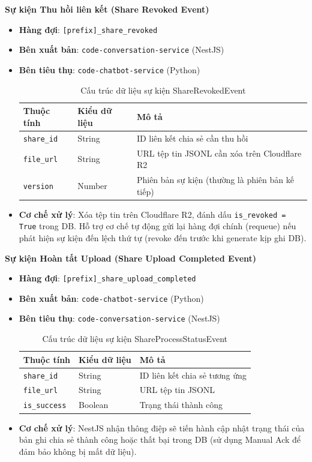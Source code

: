 \textbf{Sự kiện Thu hồi liên kết (Share Revoked Event)}
\begin{itemize}
\item \textbf{Hàng đợi}: \texttt{[prefix]\_share\_revoked}
\item \textbf{Bên xuất bản}: \texttt{code-conversation-service} (NestJS)
\item \textbf{Bên tiêu thụ}: \texttt{code-chatbot-service} (Python)

\begin{table}[H]
\centering
\begin{tabular}{|l|l|l|}
\hline
\textbf{Thuộc tính} & \textbf{Kiểu dữ liệu} & \textbf{Mô tả} \\ \hline
\texttt{share\_id} & String & ID liên kết chia sẻ cần thu hồi \\ \hline
\texttt{file\_url} & String & URL tệp tin JSONL cần xóa trên Cloudflare R2 \\ \hline
\texttt{version} & Number & Phiên bản sự kiện (thường là phiên bản kế tiếp) \\ \hline
\end{tabular}
\caption{Cấu trúc dữ liệu sự kiện ShareRevokedEvent}
\end{table}

\item \textbf{Cơ chế xử lý}: Xóa tệp tin trên Cloudflare R2, đánh dấu \texttt{is\_revoked = True} trong DB. Hỗ trợ cơ chế tự động gửi lại hàng đợi chính (requeue) nếu phát hiện sự kiện đến lệch thứ tự (revoke đến trước khi generate kịp ghi DB).
\end{itemize}

\textbf{Sự kiện Hoàn tất Upload (Share Upload Completed Event)}
\begin{itemize}
\item \textbf{Hàng đợi}: \texttt{[prefix]\_share\_upload\_completed}
\item \textbf{Bên xuất bản}: \texttt{code-chatbot-service} (Python)
\item \textbf{Bên tiêu thụ}: \texttt{code-conversation-service} (NestJS)

\begin{table}[H]
\centering
\begin{tabular}{|l|l|l|}
\hline
\textbf{Thuộc tính} & \textbf{Kiểu dữ liệu} & \textbf{Mô tả} \\ \hline
\texttt{share\_id} & String & ID liên kết chia sẻ tương ứng \\ \hline
\texttt{file\_url} & String & URL tệp tin JSONL \\ \hline
\texttt{is\_success} & Boolean & Trạng thái thành công \\ \hline
\end{tabular}
\caption{Cấu trúc dữ liệu sự kiện ShareProcessStatusEvent}
\end{table}

\item \textbf{Cơ chế xử lý}: NestJS nhận thông điệp sẽ tiến hành cập nhật trạng thái của bản ghi chia sẻ thành công hoặc thất bại trong DB (sử dụng Manual Ack để đảm bảo không bị mất dữ liệu).
\end{itemize}

